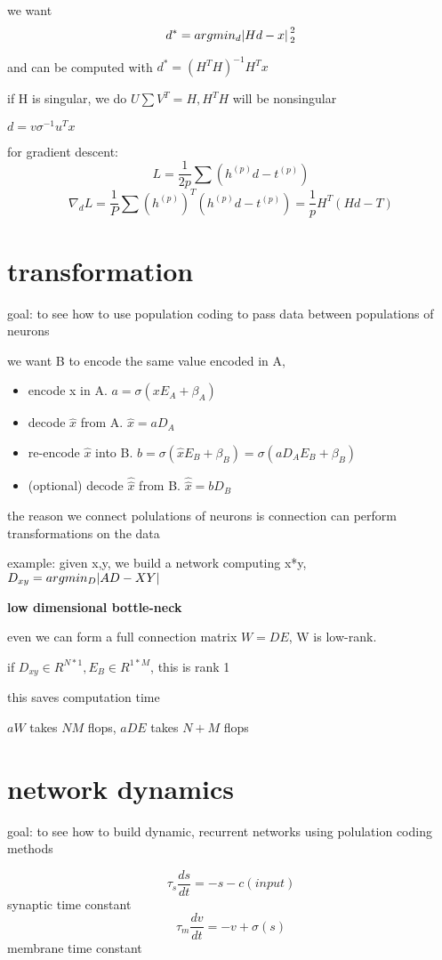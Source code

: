 \documentclass[10pt]{article}
\theoremstyle{break}
\begin{document}
we want $$d^*=argmin_d\abs*{Hd-x}_2^2$$

and can be computed with $d^*=(H^TH)^{-1}H^Tx$

if H is singular, we do $U\sum V^T = H, H^TH$ will be nonsingular

$d=v\sigma^{-1}u^Tx$

for gradient descent:
$$L=\frac{1}{2p}\sum(h^{(p)}d-t^{(p)})$$
$$\nabla_dL = \frac{1}{P}\sum (h^{(p)})^T(h^{(p)}d-t^{(p)})=\frac{1}{p}H^T (Hd-T)$$

\section{transformation}
goal: to see how to use population coding to pass data between populations of neurons 

we want B to encode the same value encoded in A, 

\begin{itemize}
    \item encode x in A. $a=\sigma(xE_A + \beta_A)$
    \item decode $\hat{x}$ from A. $\hat{x}=aD_A$
    \item re-encode $\hat{x}$ into B. $b=\sigma(\hat{x}E_B+\beta_B)=\sigma(aD_AE_B+\beta_B)$
    \item (optional) decode $\hat{\hat{x}}$ from B. $\hat{\hat{x}}=bD_B$
\end{itemize}

the reason we connect polulations of neurons is connection can perform transformations on the data

example: given x,y, we build a network computing x*y,
$D_{xy}=argmin_D\abs{AD-XY}$

\textbf{low dimensional bottle-neck}

even we can form a full connection matrix $W=DE$, W is low-rank.

if $D_{xy}\in R^{N*1}, E_B\in R^{1*M}$, this is rank 1

this saves computation time 

$aW$ takes $NM$ flops, $aDE$ takes $N+M$ flops

\section{network dynamics}
goal: to see how to build dynamic, recurrent networks using polulation coding methods 

$$\tau_s \frac{ds}{dt}=-s-c(input)$$
synaptic time constant
$$\tau_m \frac{dv}{dt}=-v+\sigma(s)$$
membrane time constant
\end{document}
